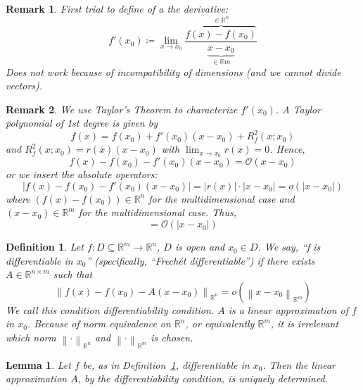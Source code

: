 \documentclass{article}
\newtheorem{definition}{Definition}  \numberwithin{definition}{section}
\newtheorem{lemma}{Lemma}  \numberwithin{lemma}{section}
\newtheorem{remark}{Remark}  \numberwithin{remark}{section}
\newcommand{\norm}[1]{\left\|#1\right\|}
\newcommand{\card}[1]{\left|#1\right|}
\begin{document}
\begin{remark}
  First trial to define of a the derivative:
  \[ f'(x_0) \coloneqq \lim_{x\to x_0} \frac{\overbrace{f(x) - f(x_0)}^{\in \mathbb R^n}}{\underbrace{x - x_0}_{\in \mathbb Rm}} \]
  Does not work because of incompatibility of dimensions (and we cannot divide vectors).
\end{remark}

\begin{remark}
  We use Taylor's Theorem to characterize $f'(x_0)$. A Taylor polynomial of 1st degree is given by
  \[ f(x) = f(x_0) + f'(x_0) (x - x_0) + R_f^2(x; x_0) \]
  and $R_f^2(x; x_0) = r(x) (x - x_0)$ with $\lim_{x\to x_0} r(x) = 0$.
  Hence,
  \[ f(x) - f(x_0) - f'(x_0)(x - x_0) = \mathcal O(x - x_0) \]
  or we insert the absolute operators:
  \[ \card{f(x) - f(x_0) - f'(x_0) (x - x_0)} = \card{r(x)} \cdot \card{x - x_0} = o(\card{x - x_0}) \]
  where $(f(x) - f(x_0)) \in \mathbb R^n$ for the multidimensional case
  and $(x - x_0) \in \mathbb R^m$ for the multidimensional case. Thus,
  \[ = \mathcal O(\card{x - x_0}) \]
\end{remark}

\begin{definition} %
  \label{defp}
  Let $f: D \subseteq \mathbb R^m \to \mathbb R^n$, $D$ is open and $x_0 \in D$.
  We say, \enquote{f is differentiable in $x_0$} (specifically, \enquote{Frech\'et differentiable})
  if there exists $A \in \mathbb R^{n \times m}$ such that
  \[ \norm{f(x) - f(x_0) - A(x - x_0)}_{\mathbb R^n} = o(\norm{x - x_0}_{\mathbb R^m}) \]
  We call this condition \emph{differentiability condition}.
  $A$ is a linear approximation of $f$ in $x_0$.
  Because of norm equivalence on $\mathbb R^n$, or equivalently $\mathbb R^m$,
  it is irrelevant which norm $\norm{\cdot}_{\mathbb R^n}$ and $\norm{\cdot}_{\mathbb R^m}$ is chosen.
\end{definition}

\begin{lemma} %
  Let $f$ be, as in Definition~\ref{defp}, differentiable in $x_0$.
  Then the linear approximation $A$, by the differentiability condition, is uniquely determined.
\end{lemma}
\end{document}
